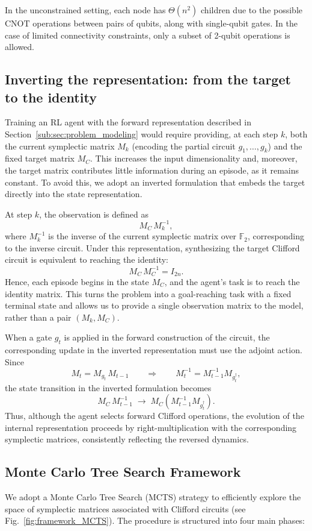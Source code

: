 \documentclass[conference]{IEEEtran}
\newcommand{\CNOT}{\ensuremath{\text{CNOT}}\xspace}
\begin{document}
In the unconstrained setting, each node has $\Theta(n^2)$ children due to the possible $\CNOT$ operations between pairs of qubits, along with single-qubit gates. In the case of limited connectivity constraints, only a subset of 2-qubit operations is allowed.

\subsection{Inverting the representation: from the target to the identity}

Training an RL agent with the forward representation described in Section~\ref{sub:sec:problem_modeling} would require providing, at each step \(k\), both the current symplectic matrix \(M_k\) (encoding the partial circuit \(g_1,\dots,g_k\)) and the fixed target matrix \(M_C\). This increases the input dimensionality and, moreover, the target matrix contributes little information during an episode, as it remains constant. To avoid this, we adopt an inverted formulation that embeds the target directly into the state representation.

At step \(k\), the observation is defined as
\[
M_C\, M_k^{-1},
\]
where \(M_k^{-1}\) is the inverse of the current symplectic matrix over \(\mathbb{F}_2\), corresponding to the inverse circuit. Under this representation, synthesizing the target Clifford circuit is equivalent to reaching the identity:
\[
M_C\, M_C^{-1} = I_{2n}.
\]
Hence, each episode begins in the state \(M_C\), and the agent’s task is to reach the identity matrix. This turns the problem into a goal-reaching task with a fixed terminal state and allows us to provide a single observation matrix to the model, rather than a pair \((M_k, M_C)\).

When a gate \(g_t\) is applied in the forward construction of the circuit, the corresponding update in the inverted representation must use the adjoint action. Since
\[
M_t = M_{g_t}\, M_{t-1} \qquad \Longrightarrow \qquad 
M_t^{-1} = M_{t-1}^{-1} M_{g_t^\dagger},
\]
the state transition in the inverted formulation becomes
\[
M_C\, M_{t-1}^{-1} \;\longrightarrow\; M_C \left(M_{t-1}^{-1} M_{g_t^\dagger}\right).
\]
Thus, although the agent selects forward Clifford operations, the evolution of the internal representation proceeds by right-multiplication with the corresponding symplectic matrices, consistently reflecting the reversed dynamics.
\subsection{Monte Carlo Tree Search Framework}\label{SubSec:MCTS}
We adopt a Monte Carlo Tree Search \cite{coulom2007} (MCTS) strategy to efficiently explore the space of symplectic matrices associated with Clifford circuits (see Fig.~\ref{fig:framework_MCTS}). The procedure is structured into four main phases:
\end{document}

